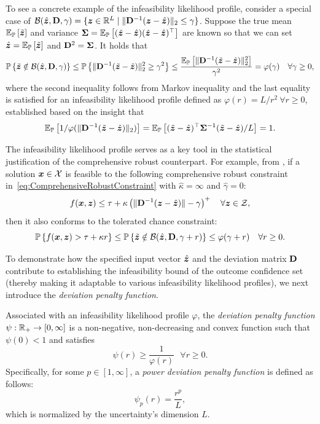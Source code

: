 \documentclass[mnsc, nonblindrev]{informswp}
\newcommand{\1}[1]{\mathds{1}{\left(#1\right)}}
\begin{document}
To see a concrete example of the infeasibility likelihood profile, consider a special case of $\mathcal{B}(\hat{\bm{z}}, {\mathbf{D}}, \gamma) = \{ \bm z \in \mathbb{R}^L \;|\; \| {\mathbf{D}}^{-1} (\bm z - \hat{\bm{z}}) \|_2 \leq \gamma \}$. Suppose the true mean $\mathbb{E}_{\mathbb{P}}\left[\tilde{\bm{z}}\right]$ and variance $\bm \Sigma = \mathbb{E}_{\mathbb{P}}\left[(\tilde{\bm{z}} - \hat{\bm{z}})(\tilde{\bm{z}} - \hat{\bm{z}})^\top\right]$ are known so that we can set $\hat{\bm{z}} = \mathbb{E}_{\mathbb{P}}\left[\tilde{\bm{z}}\right]$ and ${\mathbf{D}}^2 = {\mathbf{\Sigma}}$. It holds that
$$
\mathbb{P}\left\{\tilde{\bm{z}} \notin \mathcal{B}(\hat{\bm{z}}, {\mathbf{D}}, \gamma)\right\} \leq  \mathbb{P}\left\{\|{\mathbf{D}}^{-1} (\tilde{\bm{z}} - \hat{\bm{z}})\|^2_2 \geq \gamma^2\right\} \leq \frac{\mathbb{E}_{\mathbb{P}}\left[\|{\mathbf{D}}^{-1} (\tilde{\bm{z}} - \hat{\bm{z}})\|^2_2\right]}{\gamma^2} = \varphi(\gamma) ~~~\forall \gamma \geq 0,
$$
where the second inequality follows from Markov inequality and the last equality is satisfied for an infeasibility likelihood profile defined as $\varphi(r) = L/r^2 ~\forall r\geq 0$, established based on the insight that 
$$
\mathbb{E}_{\mathbb{P}}\left[1/ \varphi(\|{\mathbf{D}}^{-1}(\tilde{\bm{z}} - \hat{\bm{z}})\|_2) \right] = \mathbb{E}_{\mathbb{P}}\left[(\tilde{\bm{z}} - \hat{\bm{z}})^\top \bm \Sigma^{-1}(\tilde{\bm{z}} - \hat{\bm{z}})/L\right] = 1.
$$

The infeasibility likelihood profile serves as a key tool in the statistical justification of the comprehensive robust counterpart. For example, from , if a solution $\bm x \in \mathcal{X}$ is feasible to the following comprehensive robust constraint in~\eqref{eq:ComprehensiveRobustConstraint} with $\hat \kappa = \infty$ and $\hat \gamma = 0$:
$$
f(\bm x,\bm z) \leq \tau + \kappa  \left(\|{\mathbf{D}}^{-1} (\bm{z} - \hat{\bm{z}})\| -\gamma \right)^+ ~~~\forall \bm z \in \mathcal{Z},
$$
then it also conforms to the tolerated chance constraint:
$$
\mathbb{P}\left\{f(\bm x,\bm z) > \tau + \kappa r\right\} \leq \mathbb{P}\left\{\tilde{\bm{z}} \notin \mathcal{B}(\hat{\bm{z}},{\mathbf{D}}, \gamma + r)\right\} \leq \varphi(\gamma + r) \quad \forall r \geq 0.
$$

To demonstrate how the specified input vector $\hat{\bm{z}}$ and the deviation matrix ${\mathbf{D}}$ contribute to establishing the infeasibility bound of the outcome confidence set (thereby making it adaptable to various infeasibility likelihood profiles), we next introduce the \textit{deviation penalty function}. 

\begin{definition}
\textnormal{
Associated with an infeasibility likelihood profile $\varphi$, the \textit{deviation penalty function} $ \psi:\mathbb{R}_+ \rightarrow [0,\infty]$ is a non-negative, non-decreasing and convex function such that $\psi(0)<1$ and satisfies
$$
\psi(r) \geq \frac{1}{\varphi(r)} ~~~\forall r \geq 0.
$$
Specifically, for some $p \in [1,\infty]$, a \textit{power deviation penalty function} is defined as follows:
$$
\psi_p(r) = \frac{r^p}{L},
$$
which is normalized by the uncertainty's dimension $L$.
}
\end{definition}
\end{document}
